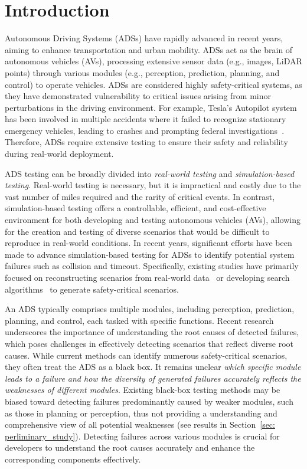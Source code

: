 \section{Introduction}\label{sec: Introduction}


Autonomous Driving Systems (ADSs) have rapidly advanced in recent years, aiming to enhance transportation and urban mobility. ADSs act as the brain of autonomous vehicles (AVs), processing extensive sensor data (e.g., images, LiDAR points) through various modules (e.g., perception, prediction, planning, and control) to operate vehicles. ADSs are considered highly safety-critical systems, as they have demonstrated vulnerability to critical issues arising from minor perturbations in the driving environment. For example, Tesla’s Autopilot system has been involved in multiple accidents where it failed to recognize stationary emergency vehicles, leading to crashes and prompting federal investigations~\cite{electrek2023tesla}.
Therefore, ADSs require extensive testing to ensure their safety and reliability during real-world deployment.  

ADS testing can be broadly divided into \textit{real-world testing} and \textit{simulation-based testing}. Real-world testing is necessary, but it is impractical and costly due to the vast number of miles required and the rarity of critical events. In contrast, simulation-based testing offers a controllable, efficient, and cost-effective environment for both developing and testing autonomous vehicles (AVs), allowing for the creation and testing of diverse scenarios that would be difficult to reproduce in real-world conditions. In recent years, significant efforts have been made to advance simulation-based testing for ADSs to identify potential system failures such as collision and timeout. 
Specifically, existing studies have primarily focused on reconstructing scenarios from real-world data~\cite{van2015automated,fang2020augmented,kruber2018unsupervised} or developing search algorithms~\cite{rana2021building,cheng2023behavexplor,zhang2022adversarial} to generate safety-critical scenarios. 


An ADS typically comprises multiple modules, including perception, prediction, planning, and control, each tasked with specific functions. Recent research~\cite{lou2022testing} underscores the importance of understanding the root causes of detected failures, which poses challenges in effectively detecting scenarios that reflect diverse root causes. While current methods can identify numerous safety-critical scenarios, they often treat the ADS as a black box. It remains unclear \textit{which specific module leads to a failure and how the diversity of generated failures accurately reflects the weaknesses of different modules}. Existing black-box testing methods may be biased toward detecting failures predominantly caused by weaker modules, such as those in planning or perception, thus not providing a understanding and comprehensive view of all potential weaknesses (see results in Section~\ref{sec: perliminary_study}). Detecting failures across various modules is crucial for developers to understand the root causes accurately and enhance the corresponding components effectively. 


